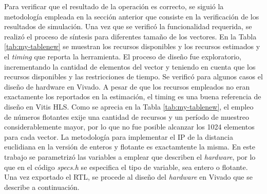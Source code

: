 \documentclass[conference]{IEEEtran}
\begin{document}
 Para verificar que el resultado de la operación es correcto, se siguió la metodología empleada en la sección anterior que consiste en la verificación de los resultados de simulación.  Una vez que se verificó la funcionalidad requerida, se realizó el  proceso de síntesis para diferentes tamaño de los vectores. En la Tabla \ref{tab:my-tablenew} se muestran los recursos disponibles y los recursos estimados y el \textit{timing} que reporta la herramienta. El proceso de diseño fue exploratorio, incrementando la cantidad de elementos del vector y teniendo en cuenta que los recursos disponibles y las restricciones de tiempo. Se verificó  para algunos casos  el diseño de hardware en Vivado. A pesar de que los recursos empleados no eran exactamente los reportados en la estimación, el timing es una buena referencia de diseño en Vitis HLS. Como se aprecia en la Tabla \ref{tab:my-tablenew}, el empleo de números flotantes exije una cantidad de recursos y un período de muestreo considerablemente mayor, por lo que no fue posible alcanzar los 1024 elementos para cada vector. La metodología para implementar el IP de la distancia euclidiana en la versión de enteros y flotante es exactamtente la misma. En este trabajo se parametrizó las variables a emplear que describen el \textit{hardware}, por lo que en el código \textit{specs.h} se especifica el tipo de variable, sea entero o flotante. Una vez exportado el RTL, se procede al diseño del \textit{hardware} en Vivado que se describe a continuación.
\end{document}
